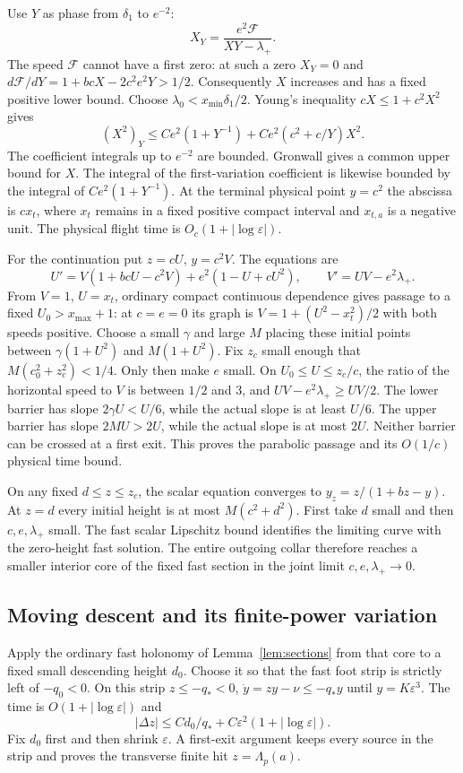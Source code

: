Use $Y$ as phase from $\delta_1$ to $e^{-2}$:
\[
 X_Y=\frac{e^2\mathcal F}{XY-\lambda_+}.
\]
The speed $\mathcal F$ cannot have a first zero: at such a zero
$X_Y=0$ and
$d\mathcal F/dY=1+bcX-2c^2e^2Y>1/2$.
Consequently $X$ increases and has a fixed positive lower bound.
Choose $\lambda_0<x_{\min}\delta_1/2$. Young's inequality
$cX\le1+c^2X^2$ gives
\[
 (X^2)_Y\le Ce^2(1+Y^{-1})
                     +Ce^2(c^2+c/Y)X^2 .
\]
The coefficient integrals up to $e^{-2}$ are bounded.
Gronwall gives a common upper bound for $X$.
The integral of the first-variation coefficient is likewise
bounded by the integral of $Ce^2(1+Y^{-1})$.
At the terminal physical point $y=c^2$ the abscissa is $cx_t$,
where $x_t$ remains in a fixed positive compact interval and
$x_{t,a}$ is a negative unit. The physical flight time is
$O_c(1+|\log\varepsilon|)$.

For the continuation put $z=cU$, $y=c^2V$. The equations are
\[
 U'=V(1+bcU-c^2V)+e^2(1-U+cU^2),\qquad
 V'=UV-e^2\lambda_+ .
\]
From $V=1$, $U=x_t$, ordinary compact continuous dependence
gives passage to a fixed $U_0>x_{\max}+1$:
at $c=e=0$ its graph is
$V=1+(U^2-x_t^2)/2$ with both speeds positive.
Choose a small $\gamma$ and large $M$ placing these initial
points between $\gamma(1+U^2)$ and $M(1+U^2)$.
Fix $z_c$ small enough that $M(c_0^2+z_c^2)<1/4$.
Only then make $e$ small. On $U_0\le U\le z_c/c$,
the ratio of the horizontal speed to $V$ is between $1/2$ and
$3$, and $UV-e^2\lambda_+\ge UV/2$.
The lower barrier has slope $2\gamma U<U/6$, while the actual
slope is at least $U/6$. The upper barrier has slope
$2MU>2U$, while the actual slope is at most $2U$.
Neither barrier can be crossed at a first exit. This proves the
parabolic passage and its $O(1/c)$ physical time bound.

On any fixed $d\le z\le z_c$, the scalar equation converges to
$y_z=z/(1+bz-y)$. At $z=d$ every initial height is at most
$M(c^2+d^2)$. First take $d$ small and then $c,e,\lambda_+$
small. The fast scalar Lipschitz bound identifies the limiting
curve with the zero-height fast solution.
The entire outgoing collar therefore reaches a smaller interior
core of the fixed fast section in the joint limit
$c,e,\lambda_+\to0$.

\subsection{Moving descent and its finite-power variation}
Apply the ordinary fast holonomy of Lemma~\ref{lem:sections}
from that core to a fixed small descending height $d_0$.
Choose it so that the fast foot strip is strictly left of
$-q_0<0$. On this strip $z\le-q_*<0$,
$\dot y=zy-\nu\le-q_*y$ until $y=K\varepsilon^3$.
The time is $O(1+|\log\varepsilon|)$ and
\[
 |\Delta z|\le Cd_0/q_*+
                       C\varepsilon^2(1+|\log\varepsilon|).
\]
Fix $d_0$ first and then shrink $\varepsilon$. A first-exit
argument keeps every source in the strip and proves the
transverse finite hit $z=\Lambda_p(a)$.

